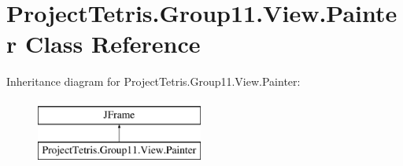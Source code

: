 \hypertarget{class_project_tetris_1_1_group11_1_1_view_1_1_painter}{}\section{Project\+Tetris.\+Group11.\+View.\+Painter Class Reference}
\label{class_project_tetris_1_1_group11_1_1_view_1_1_painter}
Inheritance diagram for Project\+Tetris.\+Group11.\+View.\+Painter\+:\begin{figure}[H]
\begin{center}
\leavevmode
\includegraphics[height=2.000000cm]{class_project_tetris_1_1_group11_1_1_view_1_1_painter}
\end{center}
\end{figure}
